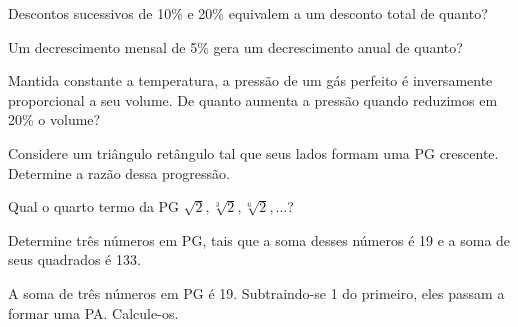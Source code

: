 \begin{exercise}
    Descontos sucessivos de 10\% e 20\% equivalem a um desconto
total de quanto?
\end{exercise}



\begin{exercise}
    Um decrescimento mensal de 5\% gera um decrescimento anual de
quanto?
\end{exercise}


\begin{exercise}
    Mantida constante a temperatura, a pressão de um gás perfeito é
inversamente proporcional a seu volume. De quanto aumenta a pressão
quando reduzimos em 20\% o volume?
\end{exercise}



\begin{exercise}
    Considere um triângulo retângulo tal que seus lados formam uma
PG crescente. Determine a razão dessa progressão.
\end{exercise}

\begin{exercise}
    Qual o quarto termo da PG $\sqrt 2 , \sqrt[3] 2 , \sqrt[6] 2 ,
\dots$?
\end{exercise}

\begin{exercise}
    Determine três números em PG, tais que a soma desses números é
19 e a soma de seus quadrados é 133.
\end{exercise}

\begin{exercise}
    A soma de três números em PG é 19. Subtraindo-se 1 do primeiro,
eles passam a formar uma PA. Calcule-os.
\end{exercise}

